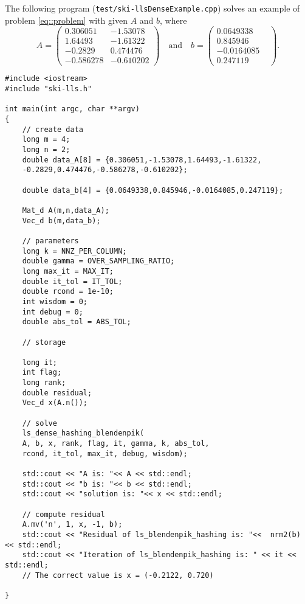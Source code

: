 \documentclass[english,11pt]{article}
\begin{document}
The following program ({\tt test/ski-llsDenseExample.cpp}) solves an example of problem \eqref{eq::problem} with given $A$ and $b$, where 
\begin{equation}
A = \begin{pmatrix}
0.306051 & -1.53078 \\
1.64493 & -1.61322 \\
-0.2829 & 0.474476	\\
-0.586278 & -0.610202 
\end{pmatrix} \quad \text{and} \quad 
b = \begin{pmatrix}
0.0649338 \\
0.845946 \\
-0.0164085\\
0.247119 & 
\end{pmatrix}.
\end{equation}

\begin{lstlisting}[breaklines=true, showstringspaces=false]
#include <iostream>
#include "ski-lls.h" 

int main(int argc, char **argv)
{
	// create data
	long m = 4;
	long n = 2;
	double data_A[8] = {0.306051,-1.53078,1.64493,-1.61322,
	-0.2829,0.474476,-0.586278,-0.610202}; 

	double data_b[4] = {0.0649338,0.845946,-0.0164085,0.247119};

	Mat_d A(m,n,data_A);
	Vec_d b(m,data_b);

	// parameters
	long k = NNZ_PER_COLUMN;
	double gamma = OVER_SAMPLING_RATIO;
	long max_it = MAX_IT;
	double it_tol = IT_TOL;
	double rcond = 1e-10;
	int wisdom = 0;
	int debug = 0;
	double abs_tol = ABS_TOL;

	// storage

	long it;
	int flag;
	long rank;
	double residual;   
	Vec_d x(A.n());

	// solve
	ls_dense_hashing_blendenpik(
	A, b, x, rank, flag, it, gamma, k, abs_tol, 
	rcond, it_tol, max_it, debug, wisdom);

	std::cout << "A is: "<< A << std::endl;
	std::cout << "b is: "<< b << std::endl;
	std::cout << "solution is: "<< x << std::endl;

	// compute residual
	A.mv('n', 1, x, -1, b); 
	std::cout << "Residual of ls_blendenpik_hashing is: "<<  nrm2(b) << std::endl;
	std::cout << "Iteration of ls_blendenpik_hashing is: " << it << std::endl;
	// The correct value is x = (-0.2122, 0.720)

}
\end{lstlisting}
\end{document}
